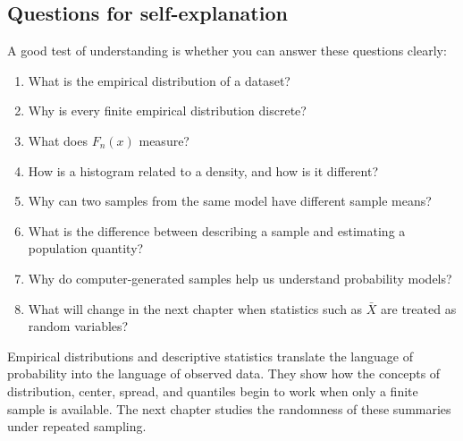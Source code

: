 \subsection*{Questions for self-explanation}

A good test of understanding is whether you can answer these questions clearly:
\begin{enumerate}
    \item What is the empirical distribution of a dataset?
    \item Why is every finite empirical distribution discrete?
    \item What does \(F_n(x)\) measure?
    \item How is a histogram related to a density, and how is it different?
    \item Why can two samples from the same model have different sample means?
    \item What is the difference between describing a sample and estimating a
    population quantity?
    \item Why do computer-generated samples help us understand probability models?
    \item What will change in the next chapter when statistics such as \(\bar{X}\)
    are treated as random variables?
\end{enumerate}

\begin{summarybox}
Empirical distributions and descriptive statistics translate the language of
probability into the language of observed data. They show how the concepts of
distribution, center, spread, and quantiles begin to work when only a finite
sample is available. The next chapter studies the randomness of these summaries
under repeated sampling.
\end{summarybox}
